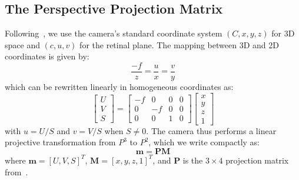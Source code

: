 \subsection{The Perspective Projection Matrix}
Following~, we use the camera's standard coordinate system $(C, x, y, z)$ for 3D space and $(c, u, v)$ for the retinal plane. The mapping between 3D and 2D coordinates is given by:
\begin{equation}
\frac{-f}{z} = \frac{u}{x} = \frac{v}{y}
\label{eq:2.1.1/coord_relation}
\end{equation}
which can be rewritten linearly in homogeneous coordinates as:
\begin{equation}
\begin{bmatrix}
U \\ V \\ S
\end{bmatrix}
=
\begin{bmatrix}
-f & 0 & 0 & 0 \\
0 & -f & 0 & 0 \\
0 & 0 & 1 & 0
\end{bmatrix}
\begin{bmatrix}
x \\ y \\ z \\ 1
\end{bmatrix}
\label{eq:2.1.1/linear_rewrite}
\end{equation}
with $u = U/S$ and $v = V/S$ when $S \neq 0$. The camera thus performs a linear projective transformation from $P^3$ to $P^2$, which we write compactly as:
\begin{equation}
\mathbf{m} = \mathbf{P}\mathbf{M}
\label{eq:2.1.1/short_form}
\end{equation}
where $\mathbf{m} = [U, V, S]^T$, $\mathbf{M} = [x, y, z, 1]^T$, and $\mathbf{P}$ is the $3 \times 4$ projection matrix from~.

